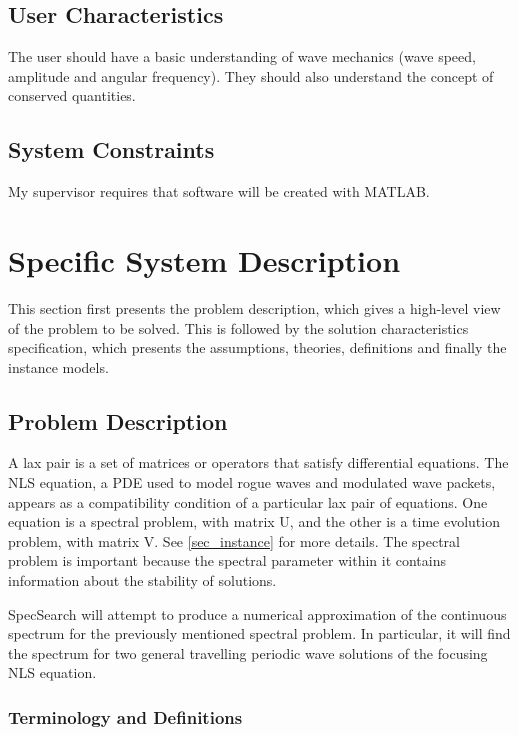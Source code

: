 \documentclass[12pt]{article}
\begin{document}
\subsection{User Characteristics} \label{SecUserCharacteristics}

The user should have a basic understanding of wave mechanics (wave 
speed, 
amplitude and angular frequency). They should also understand the concept of 
conserved quantities. 

\subsection{System Constraints}

My supervisor requires that software will be created with MATLAB.


\section{Specific System Description}

This section first presents the problem description, which gives a high-level
view of the problem to be solved.  This is followed by the solution 
characteristics specification, which presents the assumptions, theories, 
definitions and finally the instance models. 

\subsection{Problem Description} \label{Sec_pd}
A lax pair is a set of matrices or operators that satisfy differential 
equations. The NLS equation, a PDE used to model rogue waves and modulated wave 
packets, appears as a compatibility condition of a particular lax pair of 
equations. One equation is a spectral problem, with matrix U, and the other is 
a time evolution problem, with matrix V. See \ref{sec_instance} for more 
details. The spectral problem is important because the spectral parameter 
within it contains information about the stability of solutions.

SpecSearch will attempt to produce a numerical approximation of the continuous 
spectrum for the previously mentioned spectral problem. In particular, 
it will find the spectrum for two general travelling periodic wave solutions of 
the 
focusing
NLS equation.    

\subsubsection{Terminology and  Definitions}
\end{document}
